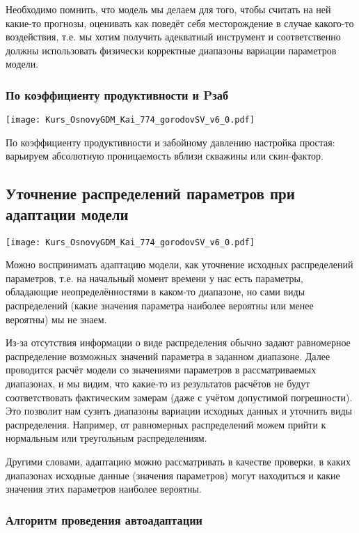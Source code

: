 \documentclass[main.tex]{subfiles}
\begin{document}
Необходимо помнить, что модель мы делаем для того, чтобы считать на ней какие-то прогнозы, оценивать как поведёт себя месторождение в случае какого-то воздействия, т.е. мы хотим получить адекватный инструмент и соответственно должны использовать физически корректные диапазоны вариации параметров модели.

\subsubsection{По коэффициенту продуктивности и Pзаб}

\texttt{[image: Kurs\_OsnovyGDM\_Kai\_774\_gorodovSV\_v6\_0.pdf]}

По коэффициенту продуктивности и забойному давлению настройка простая: варьируем абсолютную проницаемость вблизи скважины или скин-фактор.

\subsection{Уточнение распределений параметров при адаптации модели}

\texttt{[image: Kurs\_OsnovyGDM\_Kai\_774\_gorodovSV\_v6\_0.pdf]}

Можно воспринимать адаптацию модели, как уточнение исходных распределений параметров, т.е. на начальный момент времени у нас есть параметры, обладающие неопределённостями в каком-то диапазоне, но сами виды распределений (какие значения параметра наиболее вероятны или менее вероятны) мы не знаем.

Из-за отсутствия информации о виде распределения обычно задают равномерное распределение возможных значений параметра в заданном диапазоне.
Далее проводится расчёт модели со значениями параметров в рассматриваемых диапазонах, и мы видим, что какие-то из результатов расчётов не будут соответствовать фактическим замерам (даже с учётом допустимой погрешности).
Это позволит нам сузить диапазоны вариации исходных данных и уточнить виды распределения.
Например, от равномерных распределений можем прийти к нормальным или треугольным распределениям.

Другими словами, адаптацию можно рассматривать в качестве проверки, в каких диапазонах исходные данные (значения параметров) могут находиться и какие значения этих параметров наиболее вероятны.

\subsubsection{Алгоритм проведения автоадаптации}
\end{document}
